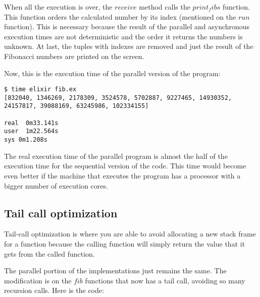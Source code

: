 When all the execution is over, the $receive$ method calls the $print_fibs$
function. This function orders the calculated number by its index (mentioned on 
the $run$ function). This is necessary because the result of the parallel 
and asynchronous execution times are not deterministic and the order it returns 
the numbers is unknown. At last, the tuples with indexes are removed and just 
the result of the Fibonacci numbers are printed on the screen.

Now, this is the execution time of the parallel version of the program:

\begin{verbatim}
$ time elixir fib.ex 
[832040, 1346269, 2178309, 3524578, 5702887, 9227465, 14930352, 24157817, 39088169, 63245986, 102334155]

real  0m33.141s
user  1m22.564s
sys 0m1.208s
\end{verbatim}

The real execution time of the parallel program is almost the half of the 
execution time for the sequential version of the code. This time would become 
even better if the machine that executes the program has a processor with a 
bigger number of execution cores.

\subsection{Tail call optimization}

Tail-call optimization is where you are able to avoid allocating a new stack 
frame for a function because the calling function will simply return the value 
that it gets from the called function.

The parallel portion of the implementations just remains the same. The 
modification is on the $fib$ functions that now has a tail call, avoiding so 
many recursion calls. Here is the code:

